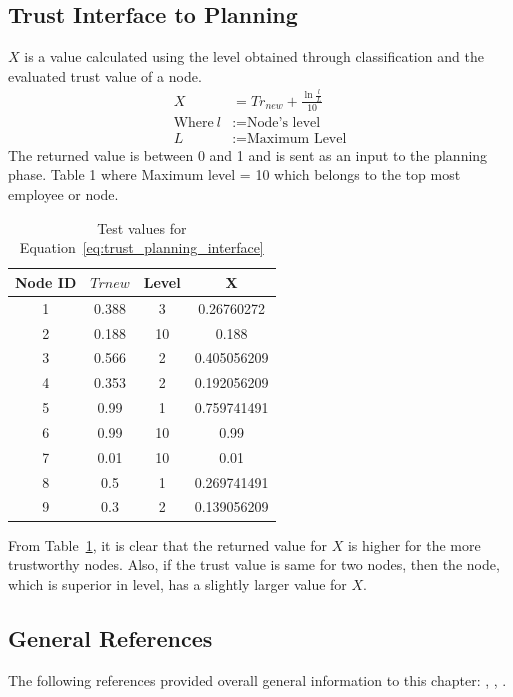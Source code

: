 \subsection{Trust Interface to Planning}
\( X \) is a value calculated using the level obtained through classification and the evaluated trust value of a node.
\begin{equation}
    \label{eq:trust_planning_interface}
    \begin{aligned}
        X &= Tr_{new} + \frac{\ln \frac{l}{L}}{10} \\
    \text{Where}~l &:= \text{Node's level} \\
    L &:= \text{Maximum Level}
    \end{aligned}
\end{equation}
The returned value is between 0 and 1 and is sent as an input to the planning phase.
Table 1 where Maximum level = 10 which belongs to the top most employee or node.
\begin{table}[h!]
    \centering
    \begin{tabular}{c | c | c | c}
        \hline
        Node ID	 & \( Tr{new} \) &	Level &	X \\
\hline \hline
1 &	0.388 &	3	 & 0.26760272 \\
2 &	0.188 &	10	 & 0.188 \\
3 &	0.566 &	2	 & 0.405056209 \\
4 &	0.353 &	2	 & 0.192056209 \\
5 &	0.99  &   1	 & 0.759741491 \\
6 &	0.99  &   10 & 	0.99 \\
7 &	0.01  &   10 & 	0.01 \\
8 &	0.5	  &   1	 & 0.269741491 \\
9 &	0.3	  &   2	 & 0.139056209 \\
\end{tabular}
\caption{Test values for Equation~\ref{eq:trust_planning_interface}}
\label{tab:trust_planning}
\end{table}

From Table~\ref{tab:trust_planning}, it is clear that the returned value for
\( X \) is higher for the more trustworthy nodes. Also, if the trust value is same for
two nodes, then the node, which is superior in level, has a slightly larger
value for \( X \).

\subsection{General References}
The following references provided overall general information to this chapter:
\autocite{JiminLi2010}, \autocite{Varadharajan2004},
\autocite{Varadharajan2005}.

